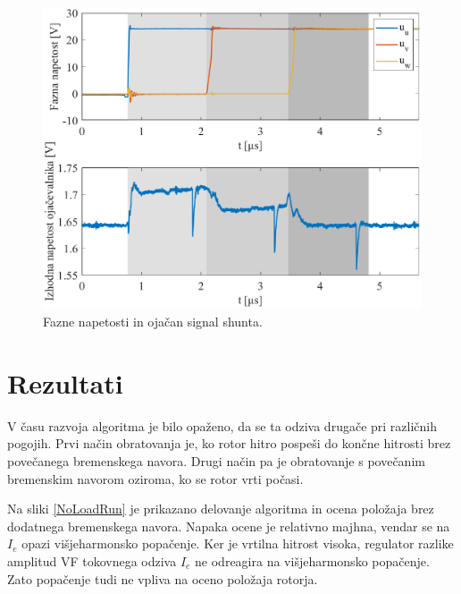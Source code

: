 \documentclass[a4paper,twoside,openright,12pt,slovene]{book}
\begin{document}
\begin{figure}[!htbp]
    \centering
    \includegraphics[width=1\columnwidth]{Slike/fazeInShunt.eps}
    \caption{\label{fazeInShunt} Fazne napetosti in ojačan signal shunta. }
\end{figure}

\newpage
\section{Rezultati} \label{rezultati}

V času razvoja algoritma je bilo opaženo, da se ta odziva drugače pri različnih pogojih. Prvi način obratovanja je, ko rotor hitro pospeši do končne hitrosti brez povečanega bremenskega navora. Drugi
način pa je obratovanje s povečanim bremenskim navorom oziroma, ko se rotor vrti počasi. 

Na sliki \ref{NoLoadRun} je prikazano delovanje algoritma in ocena položaja brez dodatnega bremenskega navora. Napaka ocene je relativno majhna, vendar se na $I_e$ opazi višjeharmonsko popačenje.
Ker je vrtilna hitrost visoka, regulator razlike amplitud VF tokovnega odziva $I_e$ ne odreagira na višjeharmonsko popačenje. Zato popačenje tudi ne vpliva na oceno položaja rotorja.
\end{document}
